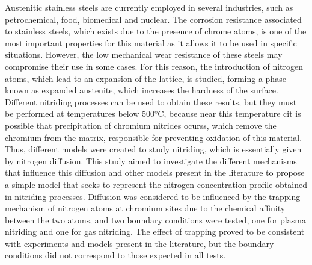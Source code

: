 Austenitic stainless steels are currently employed in several industries, such as petrochemical, food, biomedical and nuclear. The corrosion resistance associated to stainless steels, which exists due to the presence of chrome atoms, is one of the most important properties for this material as it allows it to be used in specific situations. However, the low mechanical wear resistance of these steels may compromise their use in some cases. For this reason, the introduction of nitrogen atoms, which lead to an expansion of the lattice, is studied, forming a phase known as expanded austenite, which increases the hardness of the surface. Different nitriding processes can be used to obtain these results, but they must be performed at temperatures below 500°C, because near this temperature cit is possible that precipitation of chromium nitrides ocurss, which remove the chromium from the matrix, responsible for preventing oxidation of this material. Thus, different models were created to study nitriding, which is essentially given by nitrogen diffusion. This study aimed to investigate the different mechanisms that influence this diffusion and other models present in the literature to propose a simple model that seeks to represent the nitrogen concentration profile obtained in nitriding processes. Diffusion was considered to be influenced by the trapping mechanism of nitrogen atoms at chromium sites due to the chemical affinity between the two atoms, and two boundary conditions were tested, one for plasma nitriding and one for gas nitriding. The effect of trapping proved to be consistent with experiments and models present in the literature, but the boundary conditions did not correspond to those expected in all tests.
